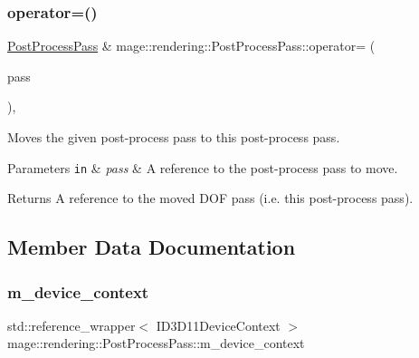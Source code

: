 \subsubsection{\texorpdfstring{operator=()}{operator=()}\hspace{0.1cm}{\footnotesize\ttfamily [2/2]}}
{\footnotesize\ttfamily \hyperlink{classmage_1_1rendering_1_1_post_process_pass}{Post\+Process\+Pass} \& mage\+::rendering\+::\+Post\+Process\+Pass\+::operator= (\begin{DoxyParamCaption}\item[{\hyperlink{classmage_1_1rendering_1_1_post_process_pass}{Post\+Process\+Pass} \&\&}]{pass }\end{DoxyParamCaption})\hspace{0.3cm}{\ttfamily [default]}, {\ttfamily [noexcept]}}

Moves the given post-\/process pass to this post-\/process pass.


\begin{DoxyParams}[1]{Parameters}
\mbox{\tt in}  & {\em pass} & A reference to the post-\/process pass to move. \\
\hline
\end{DoxyParams}
\begin{DoxyReturn}{Returns}
A reference to the moved D\+OF pass (i.\+e. this post-\/process pass). 
\end{DoxyReturn}


\subsection{Member Data Documentation}
\hypertarget{classmage_1_1rendering_1_1_post_process_pass_a18468bc4ffa408e9db3089b306f45291}{}\label{classmage_1_1rendering_1_1_post_process_pass_a18468bc4ffa408e9db3089b306f45291} 
\subsubsection{\texorpdfstring{m\+\_\+device\+\_\+context}{m\_device\_context}}
{\footnotesize\ttfamily std\+::reference\+\_\+wrapper$<$ I\+D3\+D11\+Device\+Context $>$ mage\+::rendering\+::\+Post\+Process\+Pass\+::m\+\_\+device\+\_\+context\hspace{0.3cm}{\ttfamily [private]}}

